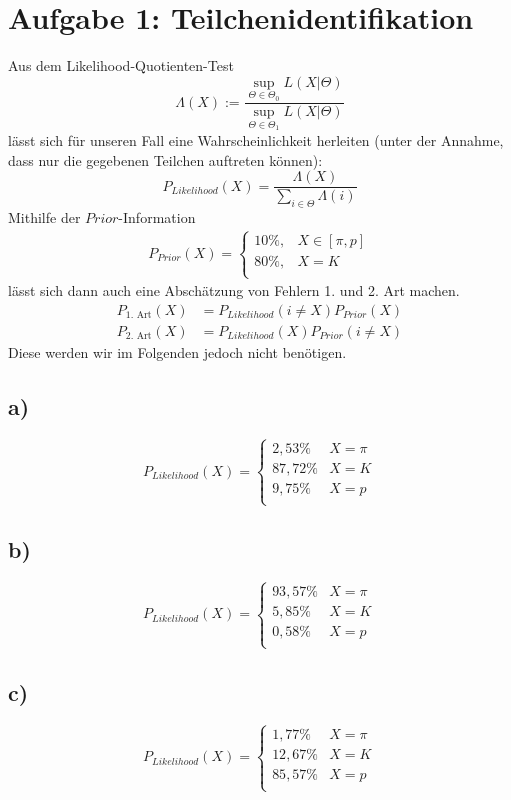 \section*{Aufgabe 1: Teilchenidentifikation}
\label{sec:Aufgabe1}
Aus dem Likelihood-Quotienten-Test
\begin{equation}
    \Lambda(X):=\frac{\sup_{\Theta\in\Theta_0}L(X|\Theta)}{\sup_{\Theta\in\Theta_1}L(X|\Theta)}
\end{equation}
lässt sich für unseren Fall eine Wahrscheinlichkeit herleiten (unter der Annahme, dass nur die gegebenen Teilchen auftreten können):
\begin{equation}
    P_{Likelihood}(X)=\frac{\Lambda(X)}{\sum_{i\in\Theta}\Lambda(i)}
\end{equation}
Mithilfe der $Prior$-Information
\begin{align}
    P_{Prior}(X)=\begin{cases}
        10\%, & X\in[\pi,p] \\
        80\%, & X = K\\
    \end{cases}
\end{align}
lässt sich dann auch eine Abschätzung von Fehlern 1. und 2. Art machen.
\begin{align}
    P_{\text{1. Art}}(X)&=P_{Likelihood}(i\neq X)P_{Prior}(X)\nonumber\\
    P_{\text{2. Art}}(X)&=P_{Likelihood}(X)P_{Prior}(i\neq X)
\end{align}
Diese werden wir im Folgenden jedoch nicht benötigen.

\subsection*{a)}
\begin{equation}
    P_{Likelihood}(X)=\begin{cases}
        2,53\%   & X=\pi\\
        87,72\%  & X=K\\
        9,75\%   & X=p\\
    \end{cases}
\end{equation}

\subsection*{b)}
\begin{equation}
    P_{Likelihood}(X)=\begin{cases}
        93,57\%   & X=\pi\\
        5,85\%    & X=K\\
        0,58\%    & X=p\\
    \end{cases}
\end{equation}

\subsection*{c)}
\begin{equation}
    P_{Likelihood}(X)=\begin{cases}
        1,77\%   & X=\pi\\
        12,67\%  & X=K\\
        85,57\%  & X=p\\
    \end{cases}
\end{equation}